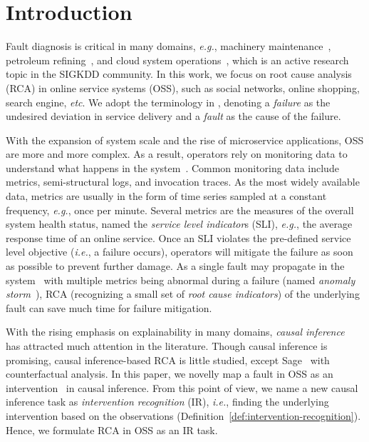 \section{Introduction}\label{sec:introduction}

Fault diagnosis is critical in many domains, \textit{e.g.}, machinery maintenance~\cite{Yi:2021}, petroleum refining~\cite{Dhaou:2021}, and cloud system operations~\cite{Pool:2020,Zhang:2021},  which is an active research topic in the SIGKDD community.
In this work, we focus on root cause analysis (RCA) in online service systems (OSS), such as social networks, online shopping, search engine, \textit{etc}.
We adopt the terminology in \cite{Notaro:2021}, denoting a \textit{failure} as the undesired deviation in service delivery and a \textit{fault} as the cause of the failure.

With the expansion of system scale and the rise of microservice applications, OSS are more and more complex.
As a result, operators rely on monitoring data to understand what happens in the system~\cite{Beyer:2016}.
Common monitoring data include metrics, semi-structural logs, and invocation traces.
As the most widely available data, metrics are usually in the form of time series sampled at a constant frequency, \textit{e.g.}, once per minute.
Several metrics are the measures of the overall system health status, named the \textit{service level indicator}s (SLI), \textit{e.g.}, the average response time of an online service.
Once an SLI violates the pre-defined service level objective (\textit{i.e.}, a failure occurs), operators will mitigate the failure as soon as possible to prevent further damage.
As a single fault may propagate in the system~\cite{Gertler:1998} with multiple metrics being abnormal during a failure (named \textit{anomaly storm}~\cite{Zhao:2020}), RCA (recognizing a small set of \textit{root cause indicators}) of the underlying fault can save much time for failure mitigation.

With the rising emphasis on explainability in many domains, \textit{causal inference}~\cite{Yao:2021} has attracted much attention in the literature.
Though causal inference is promising, causal inference-based RCA is little studied, except Sage~\cite{Gan:2021} with counterfactual analysis.
In this paper, we novelly map a fault in OSS as an intervention~\cite{Pearl:2009} in causal inference.
From this point of view, we name a new causal inference task as \textit{intervention recognition} (IR), \textit{i.e.}, finding the underlying intervention based on the observations (Definition~\ref{def:intervention-recognition}).
Hence, we formulate RCA in OSS as an IR task.

